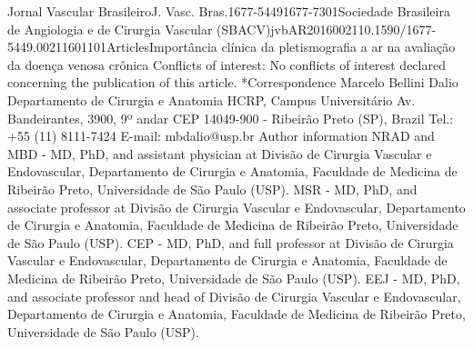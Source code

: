 \documentclass[numberinsection,times,10pt,spreadimages]{memoir}
\begin{document}
\begin{multicols}{2}

Jornal Vascular BrasileiroJ. Vasc. Bras.1677-54491677-7301Sociedade
Brasileira de Angiologia e de Cirurgia Vascular
(SBACV)jvbAR2016002110.1590/1677-5449.00211601101ArticlesImportância clínica da
pletismografia a ar na avaliação da doença
venosa crônica
Conflicts of interest: No conflicts of interest declared concerning the
publication of this article.
*Correspondence Marcelo Bellini Dalio Departamento de Cirurgia e
Anatomia HCRP, Campus Universitário Av. Bandeirantes, 3900, 9º andar CEP
14049-900 - Ribeirão Preto (SP), Brazil Tel.: +55 (11) 8111-7424 E-mail:
mbdalio@usp.br
Author information NRAD and MBD - MD, PhD, and assistant physician at Divisão
de Cirurgia Vascular e Endovascular, Departamento de Cirurgia e Anatomia,
Faculdade de Medicina de Ribeirão Preto, Universidade de São Paulo (USP).
MSR - MD, PhD, and associate professor at Divisão de Cirurgia Vascular e
Endovascular, Departamento de Cirurgia e Anatomia, Faculdade de Medicina de
Ribeirão Preto, Universidade de São Paulo (USP). CEP - MD, PhD, and full
professor at Divisão de Cirurgia Vascular e Endovascular, Departamento de
Cirurgia e Anatomia, Faculdade de Medicina de Ribeirão Preto, Universidade
de São Paulo (USP). EEJ - MD, PhD, and associate professor and head of
Divisão de Cirurgia Vascular e Endovascular, Departamento de Cirurgia e
Anatomia, Faculdade de Medicina de Ribeirão Preto, Universidade de São Paulo
(USP).


\end{multicols}
\end{document}
